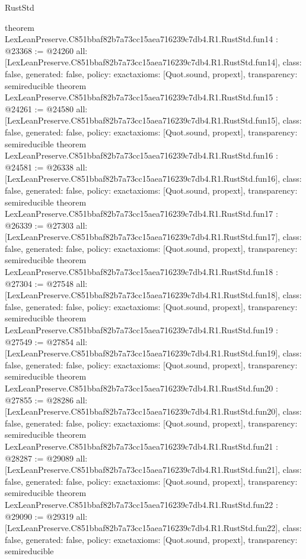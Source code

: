 \begin{lexlean}{RustStd}
\begin{coremodule}
{}
theorem LexLeanPreserve.C851bbaf82b7a73cc15aea716239c7db4.R1.RustStd.fun14 : @23368 := @24260 {
  all: [LexLeanPreserve.C851bbaf82b7a73cc15aea716239c7db4.R1.RustStd.fun14],
  class: false,
  generated: false,
  policy: exact{axioms: [Quot.sound, propext]},
  transparency: semireducible
}
theorem LexLeanPreserve.C851bbaf82b7a73cc15aea716239c7db4.R1.RustStd.fun15 : @24261 := @24580 {
  all: [LexLeanPreserve.C851bbaf82b7a73cc15aea716239c7db4.R1.RustStd.fun15],
  class: false,
  generated: false,
  policy: exact{axioms: [Quot.sound, propext]},
  transparency: semireducible
}
theorem LexLeanPreserve.C851bbaf82b7a73cc15aea716239c7db4.R1.RustStd.fun16 : @24581 := @26338 {
  all: [LexLeanPreserve.C851bbaf82b7a73cc15aea716239c7db4.R1.RustStd.fun16],
  class: false,
  generated: false,
  policy: exact{axioms: [Quot.sound, propext]},
  transparency: semireducible
}
theorem LexLeanPreserve.C851bbaf82b7a73cc15aea716239c7db4.R1.RustStd.fun17 : @26339 := @27303 {
  all: [LexLeanPreserve.C851bbaf82b7a73cc15aea716239c7db4.R1.RustStd.fun17],
  class: false,
  generated: false,
  policy: exact{axioms: [Quot.sound, propext]},
  transparency: semireducible
}
theorem LexLeanPreserve.C851bbaf82b7a73cc15aea716239c7db4.R1.RustStd.fun18 : @27304 := @27548 {
  all: [LexLeanPreserve.C851bbaf82b7a73cc15aea716239c7db4.R1.RustStd.fun18],
  class: false,
  generated: false,
  policy: exact{axioms: [Quot.sound, propext]},
  transparency: semireducible
}
theorem LexLeanPreserve.C851bbaf82b7a73cc15aea716239c7db4.R1.RustStd.fun19 : @27549 := @27854 {
  all: [LexLeanPreserve.C851bbaf82b7a73cc15aea716239c7db4.R1.RustStd.fun19],
  class: false,
  generated: false,
  policy: exact{axioms: [Quot.sound, propext]},
  transparency: semireducible
}
theorem LexLeanPreserve.C851bbaf82b7a73cc15aea716239c7db4.R1.RustStd.fun20 : @27855 := @28286 {
  all: [LexLeanPreserve.C851bbaf82b7a73cc15aea716239c7db4.R1.RustStd.fun20],
  class: false,
  generated: false,
  policy: exact{axioms: [Quot.sound, propext]},
  transparency: semireducible
}
theorem LexLeanPreserve.C851bbaf82b7a73cc15aea716239c7db4.R1.RustStd.fun21 : @28287 := @29089 {
  all: [LexLeanPreserve.C851bbaf82b7a73cc15aea716239c7db4.R1.RustStd.fun21],
  class: false,
  generated: false,
  policy: exact{axioms: [Quot.sound, propext]},
  transparency: semireducible
}
theorem LexLeanPreserve.C851bbaf82b7a73cc15aea716239c7db4.R1.RustStd.fun22 : @29090 := @29319 {
  all: [LexLeanPreserve.C851bbaf82b7a73cc15aea716239c7db4.R1.RustStd.fun22],
  class: false,
  generated: false,
  policy: exact{axioms: [Quot.sound, propext]},
  transparency: semireducible
}
\end{coremodule}
\end{lexlean}
